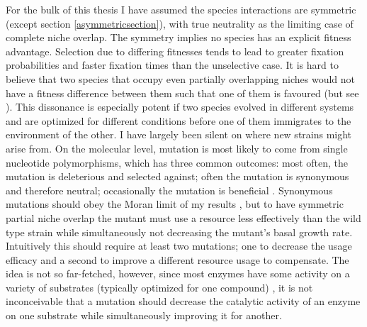 For the bulk of this thesis I have assumed the species interactions are symmetric (except section \ref{asymmetricsection}), with true neutrality as the limiting case of complete niche overlap. 
The symmetry implies no species has an explicit fitness advantage. %
Selection due to differing fitnesses tends to lead to greater fixation probabilities and faster fixation times than the unselective case. 
It is hard to believe that two species that occupy even partially overlapping niches would not have a fitness difference between them such that one of them is favoured (but see \cite{Hubbell2006,Rosindell2011}). %
This dissonance is especially potent if two species evolved in different systems and are optimized for different conditions before one of them immigrates to the environment of the other. 
I have largely been silent on where new strains might arise from. 
On the molecular level, mutation is most likely to come from single nucleotide polymorphisms, which has three common outcomes: most often, the mutation is deleterious and selected against; often the mutation is synonymous and therefore neutral; occasionally the mutation is beneficial \cite{Kimura1983,Rouzine2001,Kawecki2004,Orr2005,Desai2007,Desai2007a,Patwa2008}. 
Synonymous mutations should obey the Moran limit of my results \cite{Kimura1955}, but to have symmetric partial niche overlap the mutant must use a resource less effectively than the wild type strain while simultaneously not decreasing the mutant's basal growth rate. 
Intuitively this should require at least two mutations; one to decrease the usage efficacy and a second to improve a different resource usage to compensate. 
The idea is not so far-fetched, however, since most enzymes have some activity on a variety of substrates (typically optimized for one compound) \cite{enzyme crosstalk}, it is not inconceivable that a mutation should decrease the catalytic activity of an enzyme on one substrate while simultaneously improving it for another. %

